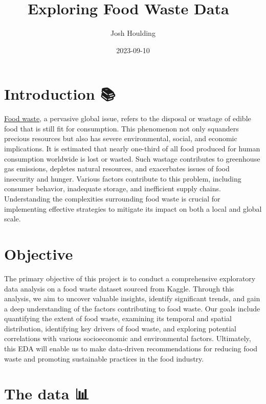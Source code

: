 \documentclass[
]{article}
\title{Exploring Food Waste Data 🍏}
\author{Josh Houlding}
\date{2023-09-10}
\begin{document}
\maketitle

\hypertarget{introduction}{%
\section{Introduction 📚}\label{introduction}}

\href{https://en.wikipedia.org/wiki/Food_loss_and_waste}{Food waste}, a
pervasive global issue, refers to the disposal or wastage of edible food
that is still fit for consumption. This phenomenon not only squanders
precious resources but also has severe environmental, social, and
economic implications. It is estimated that nearly one-third of all food
produced for human consumption worldwide is lost or wasted. Such wastage
contributes to greenhouse gas emissions, depletes natural resources, and
exacerbates issues of food insecurity and hunger. Various factors
contribute to this problem, including consumer behavior, inadequate
storage, and inefficient supply chains. Understanding the complexities
surrounding food waste is crucial for implementing effective strategies
to mitigate its impact on both a local and global scale.

\hypertarget{objective}{%
\section{Objective 🎯}\label{objective}}

The primary objective of this project is to conduct a comprehensive
exploratory data analysis on a food waste dataset sourced from Kaggle.
Through this analysis, we aim to uncover valuable insights, identify
significant trends, and gain a deep understanding of the factors
contributing to food waste. Our goals include quantifying the extent of
food waste, examining its temporal and spatial distribution, identifying
key drivers of food waste, and exploring potential correlations with
various socioeconomic and environmental factors. Ultimately, this EDA
will enable us to make data-driven recommendations for reducing food
waste and promoting sustainable practices in the food industry.

\hypertarget{the-data}{%
\section{The data 📊}\label{the-data}}
\end{document}
